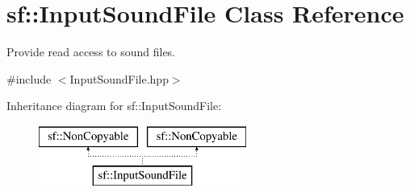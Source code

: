 \hypertarget{classsf_1_1_input_sound_file}{\section{sf\-:\-:Input\-Sound\-File Class Reference}
\label{classsf_1_1_input_sound_file}
}


Provide read access to sound files.  




{\ttfamily \#include $<$Input\-Sound\-File.\-hpp$>$}

Inheritance diagram for sf\-:\-:Input\-Sound\-File\-:\begin{figure}[H]
\begin{center}
\leavevmode
\includegraphics[height=2.000000cm]{classsf_1_1_input_sound_file}
\end{center}
\end{figure}
